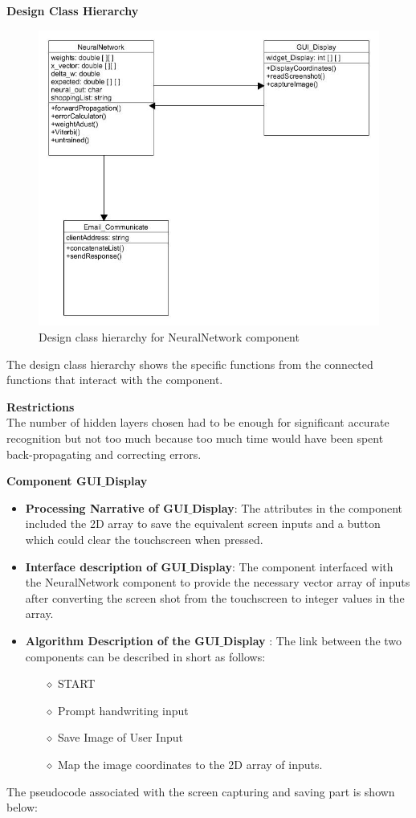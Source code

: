 \textbf{Design  Class Hierarchy}\\
\begin{figure}[h]
	\centering
	\includegraphics[scale=0.5]{41.jpg}
	\caption{Design class hierarchy for NeuralNetwork component}
\end{figure}

The design class hierarchy shows the specific functions from the connected functions that interact with the component.

\textbf{Restrictions}\\
 The number of hidden layers chosen had to be enough for significant accurate recognition but not too much because too much time would have been spent back-propagating and correcting errors.

\textbf{Component GUI$\_$Display}
\begin{itemize}
	\item \textbf{Processing Narrative of GUI$\_$Display}: The attributes in the component included the 2D array to save the equivalent screen inputs and a button which could clear the touchscreen when pressed.
	\item \textbf{Interface description of GUI$\_$Display}: The component interfaced with the NeuralNetwork component to provide the necessary vector array of inputs after converting the screen shot from the touchscreen to integer values in the array.
	\item \textbf{Algorithm Description of the GUI$\_$Display} : The link between the two components can be described in short as follows:
	\begin{itemize}
		\item[$\diamond$] START
		\item[$\diamond$] Prompt handwriting input
		\item[$\diamond$] Save Image of User Input
		\item[$\diamond$] Map the image coordinates to the 2D array of inputs.
	\end{itemize}
\end{itemize}
The pseudocode associated with the screen capturing and saving part is shown below:

